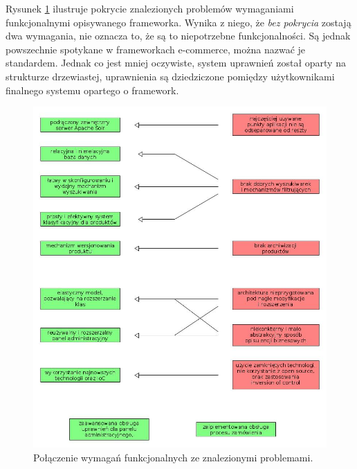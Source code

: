 Rysunek \ref{wymagania} ilustruje pokrycie znalezionych problemów wymaganiami funkcjonalnymi opisywanego frameworka. Wynika z niego, że \textit{bez pokrycia} zostają dwa wymagania, nie oznacza to, że są to niepotrzebne funkcjonalności. Są jednak powszechnie spotykane w frameworkach e-commerce, można nazwać je standardem. Jednak co jest mniej oczywiste, system uprawnień został oparty na strukturze drzewiastej, uprawnienia są dziedziczone pomiędzy użytkownikami finalnego systemu opartego o framework.
\begin{figure}
	\begin{center}
		\includegraphics[width=1\textwidth]{wymagania.jpg}
	\end{center}
	\caption{{\color{dgray}Połączenie wymagań funkcjonalnych ze znalezionymi problemami.}} \label{wymagania}
\end{figure}
